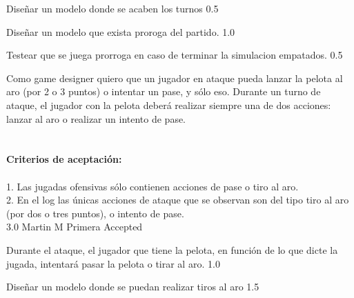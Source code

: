 		{Diseñar un modelo donde se acaben los turnos} %
		{} %
		{0.5} %
		{} %
		{} %
		{} %

		{Diseñar un modelo que exista proroga del partido.} %
		{} %
		{1.0} %
		{} %
		{} %
		{} %

		{Testear que se juega prorroga en caso de terminar la simulacion empatados.} %
		{} %
		{0.5} %
		{} %
		{} %
		{} %
\vspace{20pt}


	{Como game designer quiero que un jugador en ataque pueda lanzar la pelota al aro (por 2 o 3 puntos) o intentar un pase, y s\'olo eso.} %
	{Durante un turno de ataque, el jugador con la pelota deberá realizar siempre una de dos acciones: lanzar al aro o realizar un intento de pase. \\
  \\
  \\
\textbf{Criterios de aceptación:}\\
  \\
1. Las jugadas ofensivas sólo contienen acciones de pase o tiro al aro. \\
2. En el log las únicas acciones de ataque que se observan son del tipo tiro al aro (por dos o tres puntos), o intento de pase. \\
} %
	{} %
	{3.0} %
	{Martin M} %
	{Primera} %
	{Accepted} %

		{Durante el ataque, el jugador que tiene la pelota, en función de lo que dicte la jugada, intentará pasar la pelota o tirar al aro.} %
		{} %
		{1.0} %
		{} %
		{} %
		{} %

		{Diseñar un modelo donde se puedan realizar tiros al aro} %
		{} %
		{1.5} %
		{} %
		{} %
		{} %

